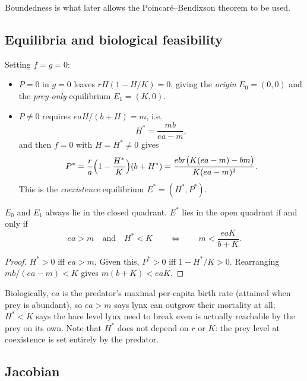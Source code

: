 Boundedness is what later allows the Poincar\'e--Bendixson theorem to be used.

\subsection{Equilibria and biological feasibility}

Setting $f=g=0$:
\begin{itemize}
\item $P=0$ in $g=0$ leaves $rH(1-H/K)=0$, giving the \emph{origin} $E_0=(0,0)$ and the
\emph{prey-only} equilibrium $E_1=(K,0)$.
\item $P\neq 0$ requires $eaH/(b+H)=m$, i.e.
\begin{equation}\label{eq:Hstar}
H^*=\frac{mb}{ea-m},
\end{equation}
and then $f=0$ with $H=H^*\neq0$ gives
\begin{equation}\label{eq:Pstar}
P^*=\frac{r}{a}\Bigl(1-\frac{H^*}{K}\Bigr)(b+H^*)
=\frac{ebr\bigl(K(ea-m)-bm\bigr)}{K(ea-m)^2}.
\end{equation}
This is the \emph{coexistence} equilibrium $E^*=(H^*,P^*)$.
\end{itemize}

\begin{proposition}[Feasibility]\label{prop:feasible}
$E_0$ and $E_1$ always lie in the closed quadrant. $E^*$ lies in the open quadrant if and only if
\[
ea>m \quad\text{and}\quad H^*<K
\qquad\Longleftrightarrow\qquad
m<\frac{eaK}{b+K}.
\]
\end{proposition}

\begin{proof}
$H^*>0$ iff $ea>m$. Given this, $P^*>0$ iff $1-H^*/K>0$. Rearranging $mb/(ea-m)<K$
gives $m(b+K)<eaK$.
\end{proof}

\noindent Biologically, $ea$ is the predator's maximal per-capita birth rate (attained when prey is
abundant), so $ea>m$ says lynx can outgrow their mortality at all; $H^*<K$ says the hare
level lynx need to break even is actually reachable by the prey on its own. Note that
$H^*$ does not depend on $r$ or $K$: the prey level at coexistence is set entirely by the
predator.

\subsection{Jacobian}

